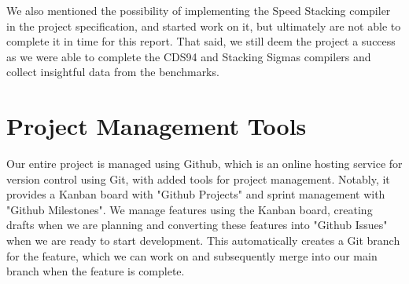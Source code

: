 We also mentioned the possibility of implementing the 
Speed Stacking compiler \cite{SpeedStacking} in the project specification, and started work on 
it, but ultimately are not able to complete it in time for this report. That said, we still 
deem the project a success as we were able to complete the CDS94 and Stacking Sigmas compilers 
and collect insightful data from the benchmarks. 

\section{Project Management Tools}
Our entire project is managed using Github, which is an online hosting service for version control using Git, with added tools for project management. Notably, it provides a 
Kanban board with "Github Projects" and sprint management with "Github Milestones". We manage 
features using the Kanban board, creating drafts when we are planning and converting these 
features into "Github Issues" when we are ready to start development. This automatically creates a 
Git branch for the feature, which we can work on and subsequently merge into our main branch 
when the feature is complete. 

